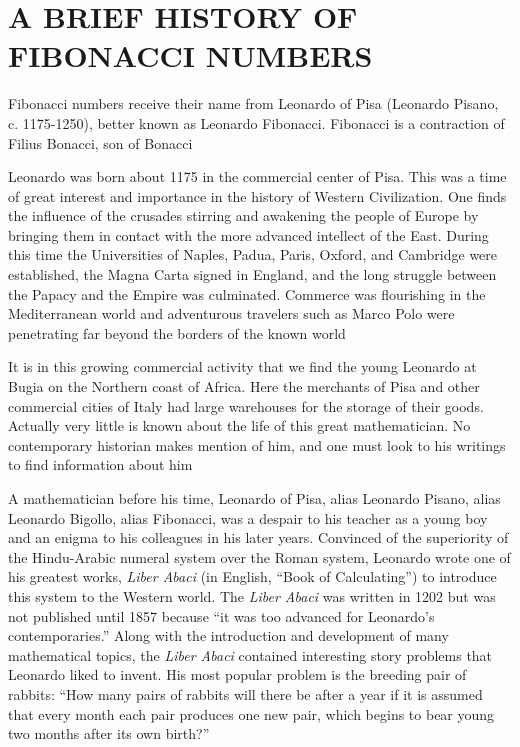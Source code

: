 \documentclass[10pt,]{book}
\theoremstyle{plain}
\theoremstyle{definition}
\begin{document}
\chapter[{A BRIEF HISTORY OF FIBONACCI NUMBERS}]{A BRIEF HISTORY OF FIBONACCI NUMBERS}\label{ch_fibs}
Fibonacci numbers receive their name from Leonardo of Pisa (Leonardo Pisano, c. 1175-1250), better known as Leonardo Fibonacci. Fibonacci is a contraction of Filius Bonacci, son of Bonacci%
\par
Leonardo was born about 1175 in the commercial center of Pisa. This was a time of great interest and importance in the history of Western Civilization. One finds the influence of the crusades stirring and awakening the people of Europe by bringing them in contact with the more advanced intellect of the East. During this time the Universities of Naples, Padua, Paris, Oxford, and Cambridge were established, the Magna Carta signed in England, and the long struggle between the Papacy and the Empire was culminated. Commerce was flourishing in the Mediterranean world and adventurous travelers such as Marco Polo were penetrating far beyond the borders of the known world%
\par
It is in this growing commercial activity that we find the young Leonardo at Bugia on the Northern coast of Africa. Here the merchants of Pisa and other commercial cities of Italy had large warehouses for the storage of their goods. Actually very little is known about the life of this great mathematician. No contemporary historian makes mention of him, and one must look to his writings to find information about him%
\par
A mathematician before his time, Leonardo of Pisa, alias Leonardo Pisano, alias Leonardo Bigollo, alias Fibonacci, was a despair to his teacher as a young boy and an enigma to his colleagues in his later years. Convinced of the superiority of the Hindu-Arabic numeral system over the Roman system, Leonardo wrote one of his greatest works, \emph{Liber Abaci} (in English, ``Book of Calculating'') to introduce this system to the Western world. The \emph{Liber Abaci} was written in 1202 but was not published until 1857 because ``it was too advanced for Leonardo's contemporaries.'' Along with the introduction and development of many mathematical topics, the \emph{Liber Abaci} contained interesting story problems that Leonardo liked to invent. His most popular problem is the breeding pair of rabbits: ``How many pairs of rabbits will there be after a year if it is assumed that every month each pair produces one new pair, which begins to bear young two months after its own birth?''%
\end{document}
